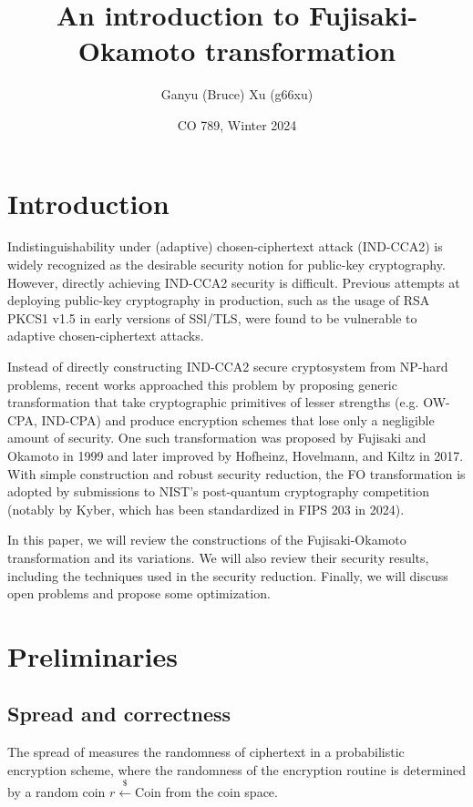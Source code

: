 \documentclass{article}
\title{An introduction to Fujisaki-Okamoto transformation}
\author{Ganyu (Bruce) Xu (g66xu)}
\date{CO 789, Winter 2024}
\newcommand{\leftsample}{\overset{{\scriptscriptstyle\$}}{\leftarrow}}
\begin{document}
\maketitle

\section{Introduction}
Indistinguishability under (adaptive) chosen-ciphertext attack (IND-CCA2) is widely recognized as the desirable security notion for public-key cryptography. However, directly achieving IND-CCA2 security is difficult. Previous attempts at deploying public-key cryptography in production, such as the usage of RSA PKCS1 v1.5 in early versions of SSl/TLS, were found to be vulnerable to adaptive chosen-ciphertext attacks.

Instead of directly constructing IND-CCA2 secure cryptosystem from NP-hard problems, recent works approached this problem by proposing generic transformation that take cryptographic primitives of lesser strengths (e.g. OW-CPA, IND-CPA) and produce encryption schemes that lose only a negligible amount of security. One such transformation was proposed by Fujisaki and Okamoto in 1999 and later improved by Hofheinz, Hovelmann, and Kiltz in 2017. With simple construction and robust security reduction, the FO transformation is adopted by submissions to NIST's post-quantum cryptography competition (notably by Kyber, which has been standardized in FIPS 203 in 2024).

In this paper, we will review the constructions of the Fujisaki-Okamoto transformation and its variations. We will also review their security results, including the techniques used in the security reduction. Finally, we will discuss open problems and propose some optimization.

\section{Preliminaries}

\subsection{Spread and correctness}
The spread of measures the randomness of ciphertext in a probabilistic encryption scheme, where the randomness of the encryption routine is determined by a random coin $r \leftsample \text{Coin}$ from the coin space.
\end{document}
